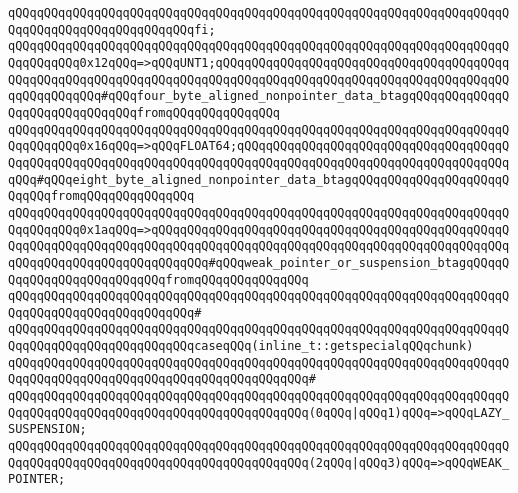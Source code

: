 \verb|qQQqqQQqqQQqqQQqqQQqqQQqqQQqqQQqqQQqqQQqqQQqqQQqqQQqqQQqqQQqqQQqqQQqqQQqqQQqqQQqqQQqqQQqqQQqqQQqfi;|\newline
\newline
\verb|qQQqqQQqqQQqqQQqqQQqqQQqqQQqqQQqqQQqqQQqqQQqqQQqqQQqqQQqqQQqqQQqqQQqqQQqqQQqqQQq0x12qQQq=>qQQqUNT1;qQQqqQQqqQQqqQQqqQQqqQQqqQQqqQQqqQQqqQQqqQQqqQQqqQQqqQQqqQQqqQQqqQQqqQQqqQQqqQQqqQQqqQQqqQQqqQQqqQQqqQQqqQQqqQQqqQQqqQQqqQQq#qQQqfour_byte_aligned_nonpointer_data_btagqQQqqQQqqQQqqQQqqQQqqQQqqQQqqQQqfromqQQqqQQqqQQqqQQq|\newline
\newline
\verb|qQQqqQQqqQQqqQQqqQQqqQQqqQQqqQQqqQQqqQQqqQQqqQQqqQQqqQQqqQQqqQQqqQQqqQQqqQQqqQQq0x16qQQq=>qQQqFLOAT64;qQQqqQQqqQQqqQQqqQQqqQQqqQQqqQQqqQQqqQQqqQQqqQQqqQQqqQQqqQQqqQQqqQQqqQQqqQQqqQQqqQQqqQQqqQQqqQQqqQQqqQQqqQQqqQQq#qQQqeight_byte_aligned_nonpointer_data_btagqQQqqQQqqQQqqQQqqQQqqQQqqQQqfromqQQqqQQqqQQqqQQq|\newline
\newline
\verb|qQQqqQQqqQQqqQQqqQQqqQQqqQQqqQQqqQQqqQQqqQQqqQQqqQQqqQQqqQQqqQQqqQQqqQQqqQQqqQQq0x1aqQQq=>qQQqqQQqqQQqqQQqqQQqqQQqqQQqqQQqqQQqqQQqqQQqqQQqqQQqqQQqqQQqqQQqqQQqqQQqqQQqqQQqqQQqqQQqqQQqqQQqqQQqqQQqqQQqqQQqqQQqqQQqqQQqqQQqqQQqqQQqqQQqqQQqqQQq#qQQqweak_pointer_or_suspension_btagqQQqqQQqqQQqqQQqqQQqqQQqqQQqfromqQQqqQQqqQQqqQQq|\newline
\verb|qQQqqQQqqQQqqQQqqQQqqQQqqQQqqQQqqQQqqQQqqQQqqQQqqQQqqQQqqQQqqQQqqQQqqQQqqQQqqQQqqQQqqQQqqQQqqQQq#|\newline
\verb|qQQqqQQqqQQqqQQqqQQqqQQqqQQqqQQqqQQqqQQqqQQqqQQqqQQqqQQqqQQqqQQqqQQqqQQqqQQqqQQqqQQqqQQqqQQqqQQqcaseqQQq(inline_t::getspecialqQQqchunk)|\newline
\verb|qQQqqQQqqQQqqQQqqQQqqQQqqQQqqQQqqQQqqQQqqQQqqQQqqQQqqQQqqQQqqQQqqQQqqQQqqQQqqQQqqQQqqQQqqQQqqQQqqQQqqQQqqQQqqQQq#|\newline
\verb|qQQqqQQqqQQqqQQqqQQqqQQqqQQqqQQqqQQqqQQqqQQqqQQqqQQqqQQqqQQqqQQqqQQqqQQqqQQqqQQqqQQqqQQqqQQqqQQqqQQqqQQqqQQqqQQq(0qQQq|\verb#|qQQq1)qQQq=>qQQqLAZY_SUSPENSION;#\newline
\verb|qQQqqQQqqQQqqQQqqQQqqQQqqQQqqQQqqQQqqQQqqQQqqQQqqQQqqQQqqQQqqQQqqQQqqQQqqQQqqQQqqQQqqQQqqQQqqQQqqQQqqQQqqQQqqQQq(2qQQq|\verb#|qQQq3)qQQq=>qQQqWEAK_POINTER;#\newline
